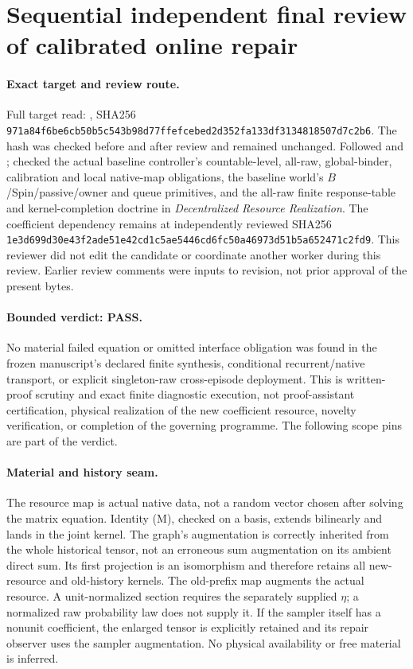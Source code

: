 \documentclass{article}
\begin{document}
\section*{Sequential independent final review of calibrated online repair}
\paragraph{Exact target and review route.}
Full target read: , SHA256
\texttt{971a84f6be6cb50b5c543b98d77ffefcebed2d352fa133df3134818507d7c2b6}.
The hash was checked before and after review and remained unchanged. Followed  and ; checked the actual baseline controller's countable-level, all-raw, global-binder, calibration and local native-map obligations, the baseline world's $B$/Spin/passive/owner and queue primitives, and the all-raw finite response-table and kernel-completion doctrine in \emph{Decentralized Resource Realization}. The coefficient dependency remains at independently reviewed SHA256
\texttt{1e3d699d30e43f2ade51e42cd1c5ae5446cd6fc50a46973d51b5a652471c2fd9}.
This reviewer did not edit the candidate or coordinate another worker during this review. Earlier review comments were inputs to revision, not prior approval of the present bytes.

\paragraph{Bounded verdict: PASS.}
No material failed equation or omitted interface obligation was found in the frozen manuscript's declared finite synthesis, conditional recurrent/native transport, or explicit singleton-raw cross-episode deployment. This is written-proof scrutiny and exact finite diagnostic execution, not proof-assistant certification, physical realization of the new coefficient resource, novelty verification, or completion of the governing programme. The following scope pins are part of the verdict.

\paragraph{Material and history seam.}
The resource map is actual native data, not a random vector chosen after solving the matrix equation. Identity (M), checked on a basis, extends bilinearly and lands in the joint kernel. The graph's augmentation is correctly inherited from the whole historical tensor, not an erroneous sum augmentation on its ambient direct sum. Its first projection is an isomorphism and therefore retains all new-resource and old-history kernels. The old-prefix map augments the actual resource. A unit-normalized section requires the separately supplied $\eta$; a normalized raw probability law does not supply it. If the sampler itself has a nonunit coefficient, the enlarged tensor is explicitly retained and its repair observer uses the sampler augmentation. No physical availability or free material is inferred.
\end{document}
